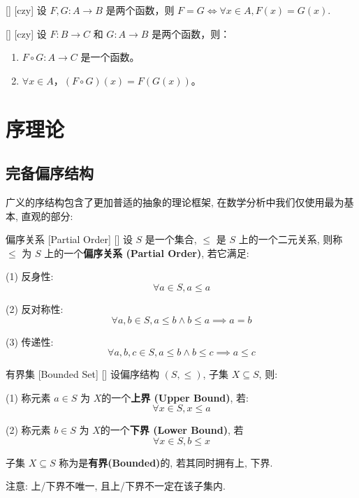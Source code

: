 \documentclass[UTF8]{ctexart}
\begin{document}
        \begin{ppt}
            [UUID]
            {}
            []
            [czy]
            设 \( F, G: A \rightarrow B \) 是两个函数，则 \( F = G \Longleftrightarrow\forall x \in A , F(x) = G(x) \).
        \end{ppt}

        \begin{thm}
            [UUID]
            {}
            []
            [czy]
            设 \( F: B \rightarrow C \) 和 \( G: A \rightarrow B \) 是两个函数，则：
            \begin{enumerate}
                \item \( F \circ G: A \rightarrow C \) 是一个函数。
                \item \(\forall x \in A \)，\( (F \circ G)(x) = F(G(x)) \)。
            \end{enumerate}
        \end{thm}

    \section{序理论}
        \subsection{完备偏序结构}

			广义的序结构包含了更加普适的抽象的理论框架, 在数学分析中我们仅使用最为基本, 直观的部分: 
			
			\begin{dfn}
			    []
			    {偏序关系}
			    [Partial Order]
			    []
				设 \(S\) 是一个集合, \(\leq\) 是 \(S\) 上的一个二元关系, 则称 \(\leq\) 为 \(S\) 上的一个\textbf{偏序关系 (Partial Order)}, 若它满足: 

				(1) 反身性:
				\[\forall a\in S, a\leq a\]

				(2) 反对称性:
				\[\forall a,b\in S, a\leq b\land b\leq a \implies a=b\]

				(3) 传递性:
				\[\forall a,b,c\in S, a\leq b\land b\leq c \implies a\leq c\]
			\end{dfn}
		
			\begin{dfn}
			    []
			    {有界集}
			    [Bounded Set]
			    []
				设偏序结构 \((S,\leq)\), 子集 \(X\subseteq S\), 则: 
				
				(1) 称元素 \(a\in S\) 为 \(X\)的一个\textbf{上界 (Upper Bound)}, 若: 
				\[\forall x\in S, x\leq a\]
				
				(2) 称元素 \(b\in S\) 为 \(X\)的一个\textbf{下界 (Lower Bound)}, 若
				\[\forall x\in S, b\leq x\]
				
				子集 \(X\subseteq S\) 称为是\textbf{有界(Bounded)}的, 若其同时拥有上, 下界. 

				注意: 上/下界不唯一, 且上/下界不一定在该子集内. 
			\end{dfn}
			
\end{document}
